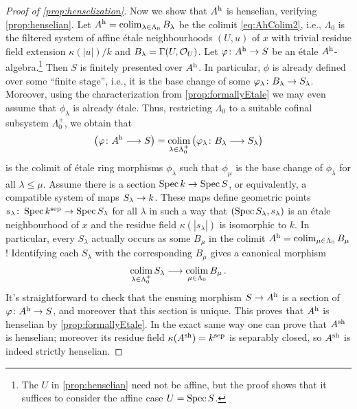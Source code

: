 \begin{proof}[Proof of \cref{prop:henselization}]
	Now we show that $A^{\mathrm{h}}$ is henselian, verifying \cref{prop:henselian}. Let $A^{\mathrm{h}}=\operatorname*{colim}_{\lambda\in\Lambda_0}B_\lambda$ be the colimit \cref{eq:AhColim2}, i.e., $\Lambda_0$ is the filtered system of affine étale neighbourhoods $(U,u)$ of $x$ with trivial residue field extension $\kappa(|u|)/k$ and $B_\lambda=\operatorname{\Gamma}(U,\mathcal{O}_U)$. Let $\phi\colon A^\h\morphism S$ be an étale $A^{\mathrm{h}}$-algebra.\footnote{The $U$ in \cref{prop:henselian} need not be affine, but the proof shows that it suffices to consider the affine case $U=\operatorname{Spec} S$.} Then $S$ is finitely presented over $A^{\mathrm{h}}$. In particular, $\phi$ is already defined over some \enquote{finite stage}, i.e., it is the base change of some $\phi_\lambda\colon B_\lambda\morphism S_\lambda$. Moreover, using the characterization from \cref{prop:formallyEtale} we may even assume that $\phi_\lambda$ is already étale. Thus, restricting $\Lambda_0$ to a suitable cofinal subsystem $\Lambda_0^+$, we obtain that 
	\begin{equation*}
		\left(\phi\colon A^\h\morphism S\right)=\colimit_{\lambda\in\Lambda_0^+}\big(\phi_\lambda\colon B_\lambda\morphism S_\lambda\big)
	\end{equation*}
	is the colimit of étale ring morphisms $\phi_\lambda$ such that $\phi_\mu$ is the base change of $\phi_\lambda$ for all $\lambda\leq \mu$. Assume there is a section $\Spec k\morphism \Spec S$, or equivalently, a compatible system of maps $S_\lambda\morphism k$. These maps define geometric points $s_\lambda\colon \Spec k^\sep \morphism\Spec S_\lambda$ for all $\lambda$ in such a way that $(\operatorname{Spec} S_\lambda,s_\lambda)$ is an étale neighbourhood of $x$ and the residue field $\kappa(|s_\lambda|)$ is isomorphic to $k$. In particular, every $S_\lambda$ actually occurs as some $B_\mu$ in the colimit $A^{\mathrm{h}}=\operatorname*{colim}_{\mu\in\Lambda_0}B_\mu$! Identifying each $S_\lambda$ with the corresponding $B_\mu$ gives a canonical morphism
	\begin{equation*}
		\colimit_{\lambda\in\Lambda_0^+}S_\lambda \morphism \colimit_{\mu\in\Lambda_0}B_\mu\,.
	\end{equation*}
	It's straightforward to check that the ensuing morphism $S\morphism A^\h$ is a section of $\phi\colon A^\h\morphism S$, and moreover that this section is unique. This proves that $A^{\mathrm{h}}$ is henselian by \cref{prop:formallyEtale}. In the exact same way one can prove that $A^{\mathrm{sh}}$ is henselian; moreover its residue field $\kappa(A^{\mathrm{sh}})=k^{\mathrm{sep}}$ is separably closed, so $A^{\mathrm{sh}}$ is indeed strictly henselian.
	

\end{proof}
